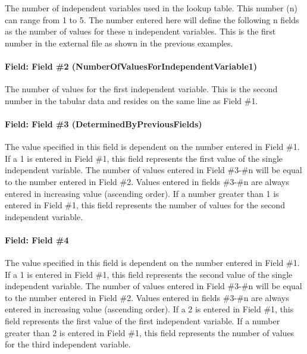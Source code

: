 The number of independent variables used in the lookup table. This number (n) can range from 1 to 5. The number entered here will define the following n fields as the number of values for these n independent variables. This is the first number in the external file as shown in the previous examples.

\paragraph{Field: Field \#2 (NumberOfValuesForIndependentVariable1)}\label{field-field-2-numberofvaluesforindependentvariable1}

The number of values for the first independent variable. This is the second number in the tabular data and resides on the same line as Field \#1.

\paragraph{Field: Field \#3 (DeterminedByPreviousFields)}\label{field-field-3-determinedbypreviousfields}

The value specified in this field is dependent on the number entered in Field \#1. If a 1 is entered in Field \#1, this field represents the first value of the single independent variable. The number of values entered in Field \#3-\#n will be equal to the number entered in Field \#2. Values entered in fields \#3-\#n are always entered in increasing value (ascending order). If a number greater than 1 is entered in Field \#1, this field represents the number of values for the second independent variable.

\paragraph{Field: Field \#4}\label{field-field-4}

The value specified in this field is dependent on the number entered in Field \#1. If a 1 is entered in Field \#1, this field represents the second value of the single independent variable. The number of values entered in Field \#3-\#n will be equal to the number entered in Field \#2. Values entered in fields \#3-\#n are always entered in increasing value (ascending order). If a 2 is entered in Field \#1, this field represents the first value of the first independent variable. If a number greater than 2 is entered in Field \#1, this field represents the number of values for the third independent variable.

